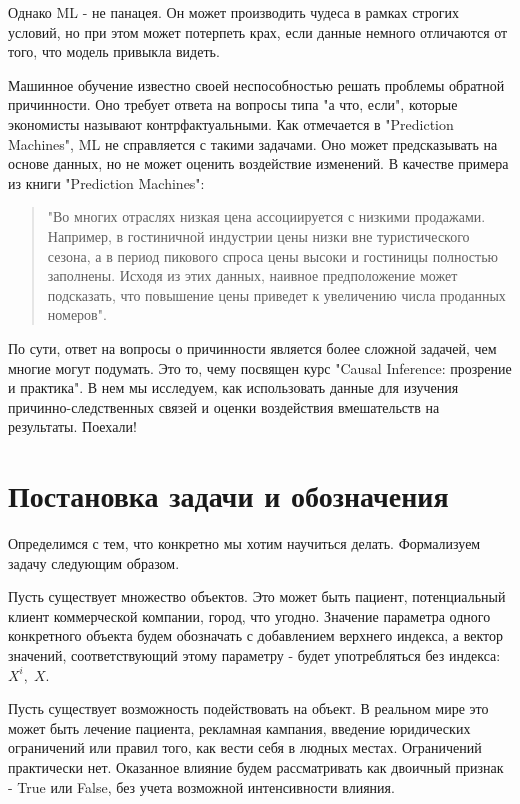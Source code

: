 \documentclass{article}
\newcommand{\coursename}{Causal Inference: прозрение и практика}
\begin{document}
        Однако ML - не панацея. Он может производить чудеса в рамках строгих условий, но при этом может потерпеть крах, если данные немного отличаются от того, что модель привыкла видеть.


        Машинное обучение известно своей неспособностью решать проблемы обратной причинности. Оно требует ответа на вопросы типа "а что, если"{}, которые экономисты называют контрфактуальными. Как отмечается в "Prediction Machines"{}, ML не справляется с такими задачами. Оно может предсказывать на основе данных, но не может оценить воздействие изменений. В качестве примера из книги "Prediction Machines":

        \begin{quote}
            "Во многих отраслях низкая цена ассоциируется с низкими продажами. Например, в гостиничной индустрии цены низки вне туристического сезона, а в период пикового спроса цены высоки и гостиницы полностью заполнены. Исходя из этих данных, наивное предположение может подсказать, что повышение цены приведет к увеличению числа проданных номеров".
        \end{quote}

        По сути, ответ на вопросы о причинности является более сложной задачей, чем многие могут подумать. Это то, чему посвящен курс "\coursename". В нем мы исследуем, как использовать данные для изучения причинно-следственных связей и оценки воздействия вмешательств на результаты. Поехали!

    \section*{Постановка задачи и обозначения}

        Определимся с тем, что конкретно мы хотим научиться делать. Формализуем задачу следующим образом.

        Пусть существует множество объектов. Это может быть пациент, потенциальный клиент коммерческой компании, город, что угодно. Значение параметра одного конкретного объекта будем обозначать с добавлением верхнего индекса, а вектор значений, соответствующий этому параметру - будет употребляться без индекса: $X^i,\; X$.

        Пусть существует возможность подействовать на объект. В реальном мире это может быть лечение пациента, рекламная кампания, введение юридических ограничений или правил того, как вести себя в людных местах. Ограничений практически нет. Оказанное влияние будем рассматривать как двоичный признак - True или False, без учета возможной интенсивности влияния.
\end{document}
